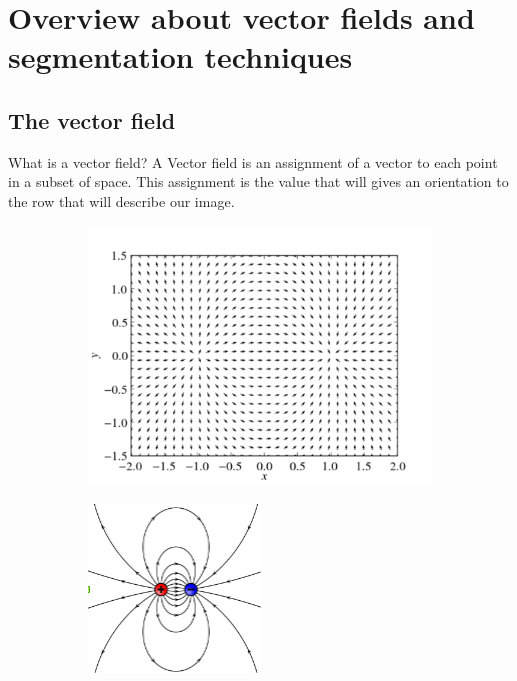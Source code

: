 
\chapter{Overview about vector fields and segmentation techniques}
\section{The vector field}
What is a vector field? A Vector field is an assignment of a vector to each point in a subset of space. This assignment is the value that will gives an orientation to the row that will describe our image.
\begin{figure}
	\centering
	\begin{subfigure}[b]{0.5\textwidth}
        \includegraphics[width=\textwidth]{img/fieldex.png}
        \caption{ }
        \label{fig:field}
    \end{subfigure}
    \begin{subfigure}[b]{0.5\textwidth}
		\includegraphics[width=\textwidth]{img/dipole.png}

\end{subfigure}
\end{figure}
